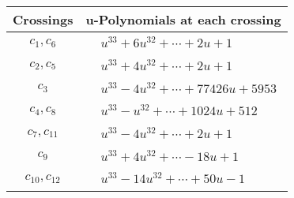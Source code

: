 \documentclass[1p]{elsarticle_modified}
\theoremstyle{definition}
\begin{document}
\begin{tabular}{m{50pt}|m{274pt}}
Crossings & \hspace{64pt}u-Polynomials at each crossing \\
\hline $$\begin{aligned}c_{1},c_{6}\end{aligned}$$&$\begin{aligned}
&u^{33}+6 u^{32}+\cdots+2 u+1
\end{aligned}$\\
\hline $$\begin{aligned}c_{2},c_{5}\end{aligned}$$&$\begin{aligned}
&u^{33}+4 u^{32}+\cdots+2 u+1
\end{aligned}$\\
\hline $$\begin{aligned}c_{3}\end{aligned}$$&$\begin{aligned}
&u^{33}-4 u^{32}+\cdots+77426 u+5953
\end{aligned}$\\
\hline $$\begin{aligned}c_{4},c_{8}\end{aligned}$$&$\begin{aligned}
&u^{33}- u^{32}+\cdots+1024 u+512
\end{aligned}$\\
\hline $$\begin{aligned}c_{7},c_{11}\end{aligned}$$&$\begin{aligned}
&u^{33}-4 u^{32}+\cdots+2 u+1
\end{aligned}$\\
\hline $$\begin{aligned}c_{9}\end{aligned}$$&$\begin{aligned}
&u^{33}+4 u^{32}+\cdots-18 u+1
\end{aligned}$\\
\hline $$\begin{aligned}c_{10},c_{12}\end{aligned}$$&$\begin{aligned}
&u^{33}-14 u^{32}+\cdots+50 u-1
\end{aligned}$\\
\hline
\end{tabular}\\~\\
\newpage\renewcommand{\arraystretch}{1}
\end{document}
